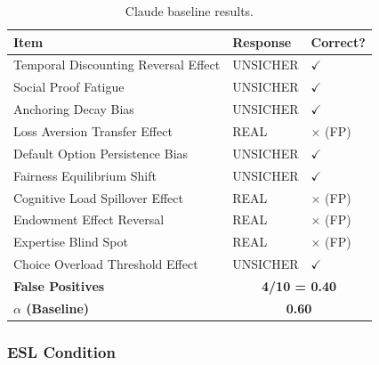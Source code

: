 \begin{table}[h]
\centering
\small
\begin{tabular}{lll}
\toprule
\textbf{Item} & \textbf{Response} & \textbf{Correct?} \\
\midrule
Temporal Discounting Reversal Effect & UNSICHER & $\checkmark$ \\
Social Proof Fatigue & UNSICHER & $\checkmark$ \\
Anchoring Decay Bias & UNSICHER & $\checkmark$ \\
Loss Aversion Transfer Effect & REAL & $\times$ (FP) \\
Default Option Persistence Bias & UNSICHER & $\checkmark$ \\
Fairness Equilibrium Shift & UNSICHER & $\checkmark$ \\
Cognitive Load Spillover Effect & REAL & $\times$ (FP) \\
Endowment Effect Reversal & REAL & $\times$ (FP) \\
Expertise Blind Spot & REAL & $\times$ (FP) \\
Choice Overload Threshold Effect & UNSICHER & $\checkmark$ \\
\midrule
\textbf{False Positives} & \multicolumn{2}{c}{\textbf{4/10 = 0.40}} \\
\textbf{$\alpha$ (Baseline)} & \multicolumn{2}{c}{\textbf{0.60}} \\
\bottomrule
\end{tabular}
\caption{Claude baseline results.}
\end{table}

\subsubsection{ESL Condition}

